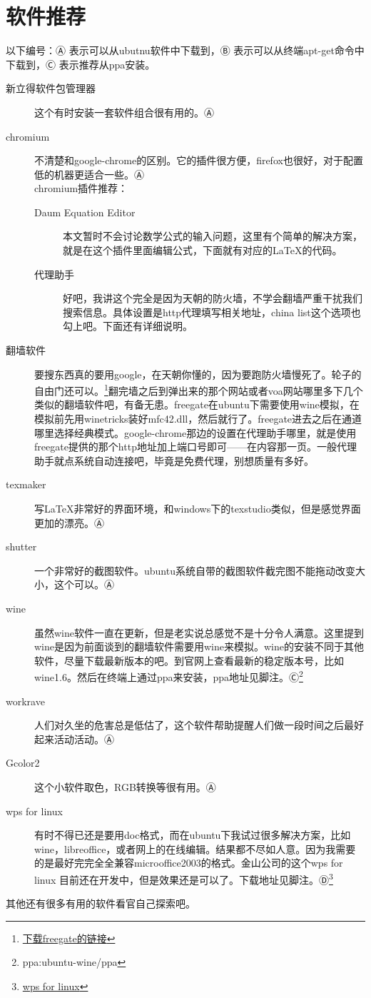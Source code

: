 \documentclass[11pt,oneside]{book}
\begin{document}
\section{软件推荐}
以下编号：Ⓐ 表示可以从ubutnu软件中下载到，Ⓑ 表示可以从终端apt-get命令中下载到，Ⓒ 表示推荐从ppa安装。
\begin{description}
\item[新立得软件包管理器] 这个有时安装一套软件组合很有用的。Ⓐ
\item[chromium] 不清楚和google-chrome的区别。它的插件很方便，firefox也很好，对于配置低的机器更适合一些。Ⓐ\\
chromium插件推荐：
\begin{description}
\item[Daum Equation Editor]  本文暂时不会讨论数学公式的输入问题，这里有个简单的解决方案，就是在这个插件里面编辑公式，下面就有对应的\LaTeX 的代码。
\item[代理助手] 好吧，我讲这个完全是因为天朝的防火墙，不学会翻墙严重干扰我们搜索信息。具体设置是http代理填写相关地址，china list这个选项也勾上吧。下面还有详细说明。
\end{description}
\item[翻墙软件] 要搜东西真的要用google，在天朝你懂的，因为要跑防火墙慢死了。轮子的自由门还可以。\footnote{\href{http://115.com/lb/5lbdvqz2o9i}{下载freegate的链接}}翻完墙之后到弹出来的那个网站或者voa网站哪里多下几个类似的翻墙软件吧，有备无患。freegate在ubuntu下需要使用wine模拟，在模拟前先用winetricks装好mfc42.dll，然后就行了。freegate进去之后在通道哪里选择经典模式。google-chrome那边的设置在代理助手哪里，就是使用freegate提供的那个http地址加上端口号即可——在内容那一页。一般代理助手就点系统自动连接吧，毕竟是免费代理，别想质量有多好。
\item[texmaker] 写\LaTeX 非常好的界面环境，和windows下的texstudio类似，但是感觉界面更加的漂亮。Ⓐ
\item[shutter] 一个非常好的截图软件。ubuntu系统自带的截图软件截完图不能拖动改变大小，这个可以。Ⓐ
\item[wine] 虽然wine软件一直在更新，但是老实说总感觉不是十分令人满意。这里提到wine是因为前面谈到的翻墙软件需要用wine来模拟。wine的安装不同于其他软件，尽量下载最新版本的吧。到官网上查看最新的稳定版本号，比如wine1.6。然后在终端上通过ppa来安装，ppa地址见脚注。Ⓒ\footnote{ppa:ubuntu-wine/ppa}
\item[workrave] 人们对久坐的危害总是低估了，这个软件帮助提醒人们做一段时间之后最好起来活动活动。Ⓐ 
\item[Gcolor2] 这个小软件取色，RGB转换等很有用。Ⓐ
\item[wps for linux] 有时不得已还是要用doc格式，而在ubuntu下我试过很多解决方案，比如wine，libreoffice，或者网上的在线编辑。结果都不尽如人意。因为我需要的是最好完完全全兼容microoffice2003的格式。金山公司的这个wps for linux 目前还在开发中，但是效果还是可以了。下载地址见脚注。Ⓓ\footnote{\href{http://linux.wps.cn/}{wps for linux}}
\end{description} 
其他还有很多有用的软件看官自己探索吧。
\end{document}
